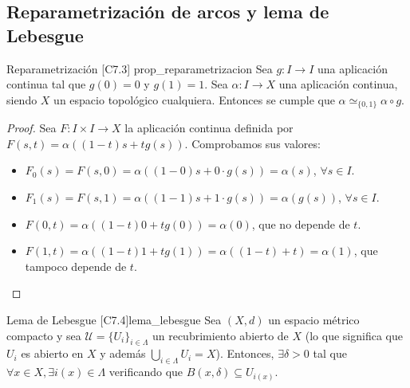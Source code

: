 \subsection{Reparametrización de arcos y lema de Lebesgue}

\begin{proposicion}{Reparametrización [C7.3] \marcaE}{prop_reparametrizacion}
Sea $g: I \longrightarrow I$ una aplicación continua tal que $g(0)=0$ y $g(1)=1$. Sea $\alpha: I \longrightarrow X$ una aplicación continua, siendo $X$ un espacio topológico cualquiera. Entonces se cumple que $\alpha \simeq_{\{0,1\}} \alpha \circ g$.
\end{proposicion}
\begin{center}
\end{center}
\begin{proof}
Sea $F: I \times I \longrightarrow X$ la aplicación continua definida por $F(s,t) = \alpha((1-t)s + t g(s))$. Comprobamos sus valores:
\begin{itemize}
\item $F_0(s) = F(s,0) = \alpha((1-0)s + 0 \cdot g(s)) = \alpha(s)$, $\forall s \in I$.
\item $F_1(s) = F(s,1) = \alpha((1-1)s + 1 \cdot g(s)) = \alpha(g(s))$, $\forall s \in I$.
\item $F(0,t) = \alpha((1-t)0 + t g(0)) = \alpha(0)$, que no depende de $t$.
\item $F(1,t) = \alpha((1-t)1 + t g(1)) = \alpha((1-t) + t) = \alpha(1)$, que tampoco depende de $t$.
\end{itemize}
\end{proof}

\begin{teorema}{Lema de Lebesgue [C7.4]}{lema_lebesgue}
Sea $(X,d)$ un espacio métrico compacto y sea $\mathcal{U} = \{U_i\}_{i \in \Lambda}$ un recubrimiento abierto de $X$ (lo que significa que $U_i$ es abierto en $X$ y además $\bigcup_{i \in \Lambda} U_i = X$). Entonces, $\exists \delta > 0$ tal que $\forall x \in X, \exists i(x) \in \Lambda$ verificando que $B(x,\delta) \subseteq U_{i(x)}$.
\end{teorema}

